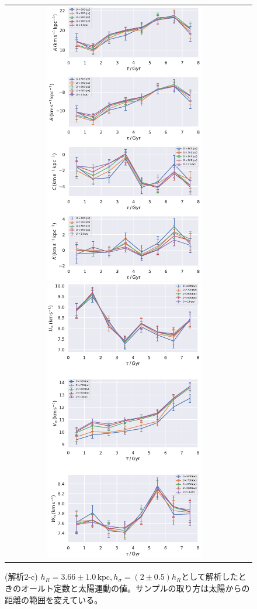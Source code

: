 \begin{figure}[htbp]
   \centering
\begin{tabular}{cc}
\includegraphics[width=7cm]{fig/ABCK_2c.pdf}
\includegraphics[width=7cm]{fig/UVW_2c.pdf}
\end{tabular}
    \caption{(解析2-c) $h_R=3.66\pm 1.0\,\mathrm{kpc},h_{\sigma}=(2\pm 0.5)h_R$として解析したときのオールト定数と太陽運動の値。サンプルの取り方は太陽からの距離の範囲を変えている。}
    \label{figObs2c}
\end{figure}

